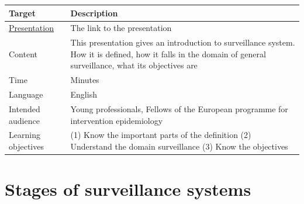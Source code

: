 \documentclass[
  letterpaper,
  DIV=11,
  numbers=noendperiod]{scrreprt}
\begin{document}

\begin{longtable}[]{@{}
  >{\raggedright\arraybackslash}p{}
  >{\raggedright\arraybackslash}p{}@{}}
\toprule\noalign{}
\begin{minipage}[b]{\linewidth}\raggedright
Target
\end{minipage} & \begin{minipage}[b]{\linewidth}\raggedright
Description
\end{minipage} \\
\midrule\noalign{}
\endhead
\bottomrule\noalign{}
\endlastfoot
\href{1_Presentations/presentation_introduction.html}{Presentation} &
The link to the presentation \\
Content & This presentation gives an introduction to surveillance
system. How it is defined, how it falls in the domain of general
surveillance, what its objectives are \\
Time & 15 Minutes \\
Language & English \\
Intended audience & Young professionals, Fellows of the European
programme for intervention epidemiology \\
Learning objectives & (1) Know the important parts of the definition (2)
Understand the domain surveillance (3) Know the objectives \\
\end{longtable}

\section*{Stages of surveillance
systems}\label{stages-of-surveillance-systems}

\end{document}
